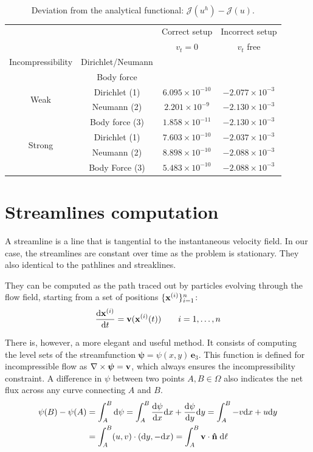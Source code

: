 \documentclass[11 pt]{report}
\begin{document}
\begin{table}[H]
    \centering
    \begin{tabular}[t]{cccc}
        \toprule
         & & Correct setup & Incorrect setup\\
         & & $v_t=0$ & $v_t$ free\\
        Incompressibility & Dirichlet/Neumann & & \\
         & Body force & & \\
        \midrule
        \multirow{2}{*}{Weak} & Dirichlet (1) & $6.095 \times 10^{-10}$ &  $-2.077 \times 10^{-3}$\\
         & Neumann (2) & $2.201 \times 10^{-9}$ &  $-2.130 \times 10^{-3}$\\
         & Body force (3) & $1.858 \times 10^{-11}$ & $-2.130 \times 10^{-3}$\\[4pt]
        \multirow{2}{*}{Strong} & Dirichlet (1) & $7.603 \times 10^{-10}$ &  $-2.037 \times 10^{-3}$\\
         & Neumann (2) & $8.898 \times 10^{-10}$ &  $-2.088 \times 10^{-3}$\\
         & Body Force (3) & $5.483 \times 10^{-10}$ & $-2.088 \times 10^{-3}$\\
        \bottomrule
    \end{tabular}
    \caption{Deviation from the analytical functional: $\mathcal{J}(u^h) - \mathcal{J}(u)$.}
    \label{tab:setups_compare}
\end{table}%


\section{Streamlines computation}
A streamline is a line that is tangential to the instantaneous velocity field. In our case, the streamlines are constant over time as the problem is stationary. They also identical to the pathlines and streaklines.

They can be computed as the path traced out by particles evolving through the flow field, starting from a set of positions $\{\mathbf{x}^{(i)}\}_{i=1}^n$:
\begin{equation}
    \dv{\mathbf{x}^{(i)}}{t} = \mathbf{v}(\mathbf{x}^{(i)}(t)) \qquad i=1, \dots, n
\end{equation}

There is, however, a more elegant and useful method. It consists of computing the level sets of the streamfunction $\boldsymbol{\psi} = \psi(x,y)\,\mathbf{e}_3$. This function is defined for incompressible flow as $\nabla \times \boldsymbol\psi = \mathbf{v}$, which always ensures the incompressibility constraint. A difference in $\psi$ between two points $A,B\in \Omega$ also indicates the net flux across any curve connecting $A$ and $B$.
\begin{equation}
    \begin{aligned}
        \psi(B) - \psi(A) &= \int_{A}^B \dd \psi = \int_{A}^B \dv{\psi}{x} \dd x + \dv{\psi}{y} \dd y = \int_{A}^B -v \dd x + u \dd y\\
        &= \int_{A}^B (u, v)\cdot (\dd y, -\dd x) = \int_{A}^B \mathbf{v} \cdot \mathbf{\hat n} \;\dd\ell
    \end{aligned}
\end{equation}
\end{document}
